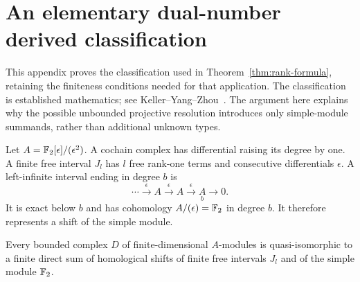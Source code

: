 \section{An elementary dual-number derived classification}
\label{app:dual-number-classification}

This appendix proves the classification used in
Theorem~\ref{thm:rank-formula}, retaining the finiteness conditions needed
for that application. The classification is established mathematics;
see Keller--Yang--Zhou~\cite[Example 3.7(b)]{keller}. The argument here
explains why the possible unbounded projective resolution introduces
only simple-module summands, rather than additional unknown types.

Let $A=\mathbb F_2[\epsilon]/(\epsilon^2)$. A cochain complex has differential
raising its degree by one. A finite free interval $J_l$ has $l$ free
rank-one terms and consecutive differentials $\epsilon$. A
left-infinite interval ending in degree $b$ is
\[
 \cdots\xrightarrow{\epsilon}A
 \xrightarrow{\epsilon}A
 \xrightarrow{\epsilon}\underset{b}{A}\longrightarrow0.
\]
It is exact below $b$ and has cohomology $A/(\epsilon)=\mathbb F_2$ in degree
$b$. It therefore represents a shift of the simple module.

\begin{proposition}
\label{prop:derived-classification}
Every bounded complex $D$ of finite-dimensional $A$-modules is
quasi-isomorphic to a finite direct sum of homological shifts of finite
free intervals $J_l$ and of the simple module $\mathbb F_2$.
\end{proposition}

